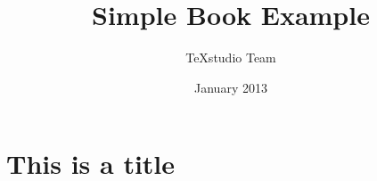 \documentclass[a4paper,12pt]{book}
\begin{document}
\author{TeXstudio Team}
\title{Simple Book Example}
\date{January 2013}

\frontmatter
\maketitle
\tableofcontents

\mainmatter
\chapter{This is a title}

\backmatter
\end{document}
